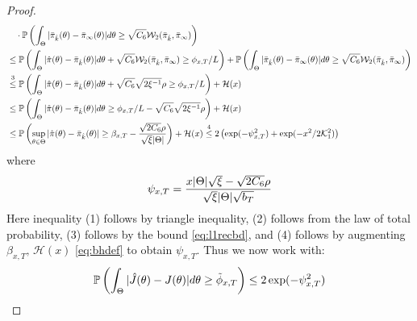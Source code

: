 \documentclass[journal,onecolumn]{IEEEtran}
\newcommand{\PR}{\mathbb{P}}
\newcommand{\wass}{\mathcal{W}_2}
\newcommand{\mk}{\mathcal{K}}
\newcommand{\wassprox}{\rho}
\newcommand{\kfv}{x} %
\newcommand{\zconst}{\xi}
\newcommand{\snum}{T}
\newcommand{\hk}{\hat{k}}
\newcommand{\csix}{C_6}
\begin{document}
{{\begin{proof}
{\begin{align*}
    & \quad \cdot \PR\left(\int_{\Theta}|\bar{\pi}_{\hk}(\theta) - \bar{\pi}_{\infty}(\theta)| d\theta \geq \sqrt{\csix}\wass(\bar{\pi}_{\hk},\bar{\pi}_{\infty})\right)\\
    & \leq \PR\left(\int_{\Theta}|\hat{\pi}(\theta) - \bar{\pi}_{\hk}(\theta)|d\theta + \sqrt{\csix}\wass(\bar{\pi}_{\hk}, \bar{\pi}_{\infty}) \geq  \phi_{\kfv,\snum}/L \right) + \PR\left(\int_{\Theta}|\bar{\pi}_{\hk}(\theta) - \bar{\pi}_{\infty}(\theta)| d\theta \geq \sqrt{\csix}\wass(\bar{\pi}_{\hk},\bar{\pi}_{\infty})\right)\\
    &\overset{3}{\leq} \PR\left(\int_{\Theta}|\hat{\pi}(\theta) - \bar{\pi}_{\hk}(\theta)|d\theta + \sqrt{\csix}\sqrt{2 \zconst^{-1}}\wassprox \geq  \phi_{\kfv,\snum}/L \right) + \mathcal{H}(x)\\
    &\leq \PR\left(\int_{\Theta}|\hat{\pi}(\theta) - \bar{\pi}_{\hk}(\theta)|d\theta \geq  \phi_{\kfv,\snum}/L - \sqrt{\csix}\sqrt{2 \zconst^{-1}}\wassprox\right) + \mathcal{H}(x)\\
     &\leq \PR\left(\sup_{\theta\in\Theta}|\hat{\pi}(\theta) - \bar{\pi}_{\hk}(\theta)| \geq \beta_{\kfv,\textcolor{black}{\snum}} - \frac{\sqrt{2\csix}\wassprox}{\sqrt{\zconst}|\Theta|}\right) + \mathcal{H}(x) \overset{4}{\leq} 2\left(\exp(-\psi_{\kfv,\snum}^2)  + \exp(-x^2 / 2\mk_1^2)\right)
\end{align*}
where 
\begin{equation}
\label{eq:psixt}
\psi_{\kfv,{\color{black}\snum }} = \frac{\kfv|\Theta|\sqrt{\zconst} - \sqrt{2\csix}\wassprox}{\sqrt{\zconst}|\Theta|\sqrt{b_T}}
\end{equation} 
Here inequality (1) follows by triangle inequality, (2) follows from the law of total probability, (3) follows by the bound \eqref{eq:l1recbd}, and (4) follows by augmenting $\beta_{\kfv,T},\, \mathcal{H}(\kfv)$ \eqref{eq:bhdef} to obtain $\psi_{\kfv,\snum}$.
Thus we now work with:
\begin{align*}
    \begin{split}
        &\PR\left(\int_{\Theta}|\hat{J}(\theta) - J(\theta)|d\theta \geq  \tilde{\phi}_{\kfv,{\color{black}\snum }}\right) \leq 2\exp(-\psi_{\kfv,{\color{black}{\color{black}\snum }}}^2)\\

\end{split}
\end{align*}}
\end{proof}}}
\end{document}
